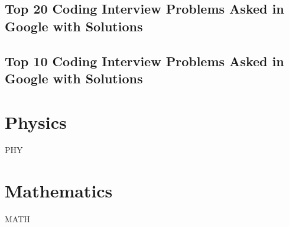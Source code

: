 \documentclass[makeidx, 12pt, oneside, onecolumn, openright, final, svgnames, dvipsnames, extrafontsizes]{memoir}
\theoremstyle{problemstyle}
\begin{document}
\chapter{Top 20 Coding Interview Problems Asked in Google with Solutions}

\chapter{Top 10 Coding Interview Problems Asked in Google with Solutions}



\part{Physics}
PHY

\part{Mathematics}
MATH
\end{document}
